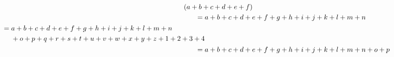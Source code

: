 \documentclass[preview, border=12pt, varwidth]{standalone}
\begin{document}
  \begin{align}
    \MoveEqLeft[3]  (a+b+c+d+e+f) \\ 
        ={}& a+b+c+d+e+f+g+h+i+j+k+l+m+n\\
    \begin{split}
      ={}& a+b+c+d+e+f+g+h+i+j+k+l+m+n \\
      &  +o+p+q+r+s+t+u+v+w+x+y+z+1+2+3+4
    \end{split} \\
      ={}& a+b+c+d+e+f+g+h+i+j+k+l+m+n+o+p
  \end{align}
\end{document}
